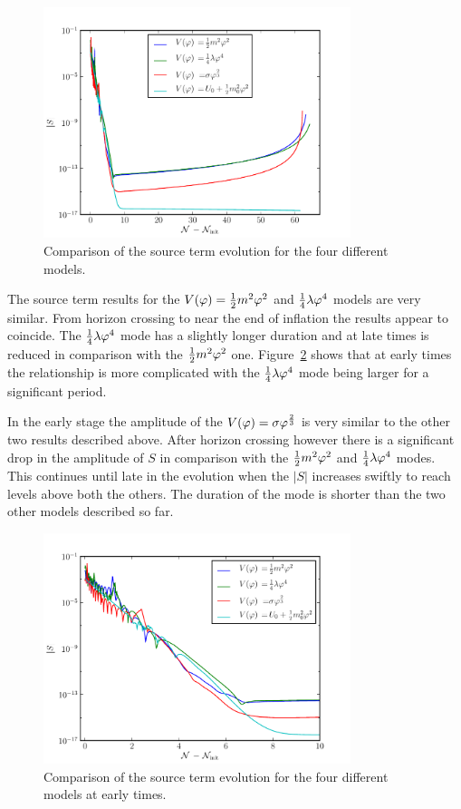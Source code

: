 \begin{figure}
 \centering
 \includegraphics[width=0.8\textwidth]{numerical/graphs/cmp_src_kwmap-large}
 \caption[Comparison of source term for models]{Comparison of the source term
evolution for the four different models.}
\label{fig:cmp-src-kwmap}
\end{figure}
% 

The source term results for the $V(\varphi)=\frac{1}{2} m^2 \varphi^2$ and $\frac{1}{4}\lambda\varphi^4$ models are very similar.
From horizon crossing to near the end of inflation the results appear to coincide.
The $\frac{1}{4}\lambda\varphi^4$ mode has a slightly longer duration and at late times is reduced in comparison
with the $\frac{1}{2} m^2 \varphi^2$ one. Figure~\ref{fig:cmp-src-zoom-kwmap} shows that at early times the
relationship is more complicated with the $\frac{1}{4}\lambda\varphi^4$ mode being larger for a significant
period.

In the early stage the amplitude of the $V(\varphi)=\sigma\varphi^{\frac{2}{3}}$ is very similar to the other two
results described above. After horizon crossing however there is a significant drop in the
amplitude of $S$ in comparison with the $\frac{1}{2} m^2 \varphi^2$ and $\frac{1}{4}\lambda\varphi^4$ modes. This continues
until late in the evolution when the $|S|$ increases swiftly to reach levels above both the others.
The duration of the mode is shorter than the two other models described so far. 

\begin{figure}
 \centering
 \includegraphics[width=0.8\textwidth]{numerical/graphs/cmp_src_kwmap_zoom-large}
 \caption[Comparison of source term for models at early stage]{Comparison of the
source term evolution for the four different models at early times.}
\label{fig:cmp-src-zoom-kwmap}
\end{figure}
% 

